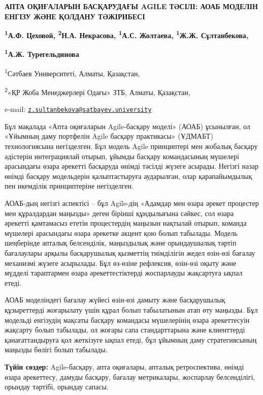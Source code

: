 {\bfseries АПТА ОҚИҒАЛАРЫН БАСҚАРУДАҒЫ AGILE ТӘСІЛІ: АОАБ МОДЕЛІН ЕНГІЗУ
ЖӘНЕ ҚОЛДАНУ ТӘЖІРИБЕСІ}

{\bfseries \textsuperscript{1}А.Ф. Цеховой, \textsuperscript{2}Н.А.
Некрасова, \textsuperscript{1}А.С. Жолтаева, \textsuperscript{1}Ж.Ж.
Сұлтанбекова\textsuperscript{\envelope },}

{\bfseries \textsuperscript{1}А.Ж. Турегельдинова}

\textsuperscript{1}Сәтбаев Университеті, Алматы, Қазақстан,

\textsuperscript{2}«ҚР Жоба Менеджерлері Одағы» ЗТБ, Алматы, Қазақстан,

e-mail:
\href{mailto:z.sultanbekova@satbayev.university}{\nolinkurl{z.sultanbekova@satbayev.university}}

Бұл мақалада «Апта оқиғаларын Agile-басқару моделі» (АОАБ) ұсынылған, ол
«Ұйымның даму портфелін Agile басқару практикасы» (ҰДМАБТ)
технологиясына негізделген. Бұл модель Agile принциптері мен жобалық
басқару әдістерін интеграциялай отырып, ұйымды басқару командасының
мүшелері арасындағы өзара әрекетті басқаруда өнімді тәсілді жүзеге
асырады. Негізгі назар өнімді басқару модельдерін қалыптастыруға
аударылған, олар қарапайымдылық пен икемділік принциптеріне негізделген.

АОАБ-дың негізгі аспектісі -- бұл Agile-дің «Адамдар мен өзара әрекет
процестер мен құралдардан маңызды» деген бірінші құндылығына сәйкес, сол
өзара әрекетті қамтамасыз ететін процестердің маңызын нақтылай отырып,
команда мүшелері арасындағы өзара әрекетке акцент қою болып табылады.
Модель шеңберінде апталық белсенділік, маңыздылық және орындаушылық
тәртіп бағалаулары арқылы басқарушылық қызметтің тиімділігін жедел
өзін-өзі бағалау механизмі жүзеге асырылады. Бұл өз-өзіне рефлексия,
өзін-өзі оқыту және мүдделі тараптармен өзара әрекеттестіктерді
жоспарлауды жақсартуға ықпал етеді.

АОАБ моделіндегі бағалау жүйесі өзін-өзі дамыту және басқарушылық
құзыреттерді жоғарылату үшін құрал болып табылатынын атап өту маңызды.
Бұл модельді енгізудің мақсаты басқару командасы мүшелерінің өзара
әрекеттесуін жақсарту болып табылады, ол жоғары сапа стандарттарына және
клиенттерді қанағаттандыруға қол жеткізуге ықпал етеді, бұл ұйымның даму
стратегиясының маңызды бөлігі болып табылады.

{\bfseries Түйін сөздер:} Agile-басқару, апта оқиғалары, апталық
ретроспектива, өнімді өзара әрекеттесу, дамуды басқару, бағалау
метрикалары, жоспарлау белсенділігі, орындау тәртібі, орындау сапасы.

